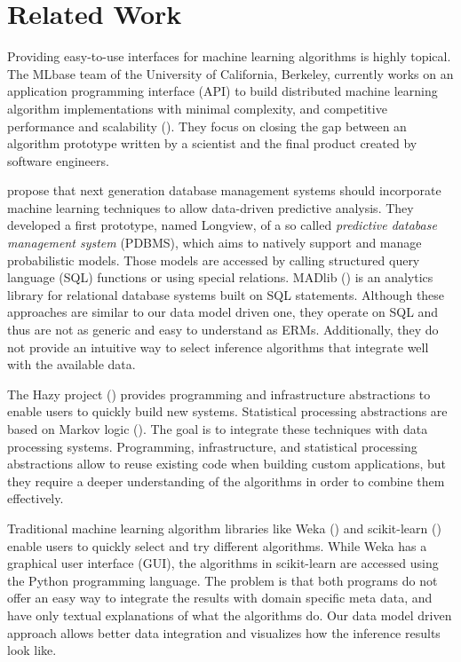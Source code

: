 \section{Related Work}

Providing easy-to-use interfaces for machine learning algorithms is highly topical. The MLbase team of the University of California, Berkeley, currently works on an application programming interface (API) to build distributed machine learning algorithm implementations with minimal complexity, and competitive performance and scalability (\cite{sparks2013mli}). They focus on closing the gap between an algorithm prototype written by a scientist and the final product created by software engineers. 

\textcite{akdere2011case} propose that next generation database management systems should incorporate machine learning techniques to allow data-driven predictive analysis. They developed a first prototype, named Longview, of a so called \emph{predictive database management system} (PDBMS), which aims to natively support and manage probabilistic models. Those models are accessed by calling structured query language (SQL) functions or using special relations. MADlib (\cite{hellerstein2012madlib}) is an analytics library for relational database systems built on SQL statements. Although these approaches are similar to our data model driven one, they operate on SQL and thus are not as generic and easy to understand as ERMs. Additionally, they do not provide an intuitive way to select inference algorithms that integrate well with the available data.

The Hazy project (\cite{kumar2013hazy}) provides programming and infrastructure abstractions to enable users to quickly build new systems. Statistical processing abstractions are based on Markov logic (\cite{domingos2007markov}). The goal is to integrate these techniques with data processing systems. Programming, infrastructure, and statistical processing abstractions allow to reuse existing code when building custom applications, but they require a deeper understanding of the algorithms in order to combine them effectively.

Traditional machine learning algorithm libraries like Weka (\cite{hall2009weka}) and scikit-learn (\cite{scikit-learn}) enable users to quickly select and try different algorithms. While Weka has a graphical user interface (GUI), the algorithms in scikit-learn are accessed using the Python programming language. The problem is that both programs do not offer an easy way to integrate the results with domain specific meta data, and have only textual explanations of what the algorithms do. Our data model driven approach allows better data integration and visualizes how the inference results look like.

